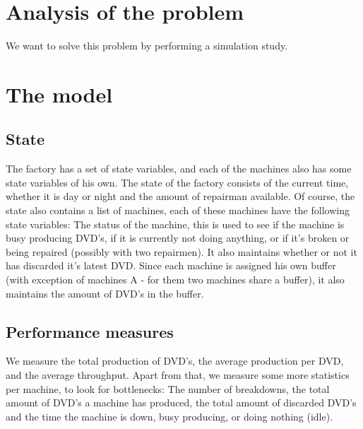 \documentclass{article}
\begin{document}
\section{Analysis of the problem}
We want to solve this problem by performing a simulation study. %


\section{The model}
\subsection{State}
The factory has a set of state variables, and each of the machines also has some state variables of his own.
The state of the factory consists of the current time, whether it is day or night and the amount of repairman available.
Of course, the state also contains a list of machines, each of these machines have the following state variables:
The status of the machine, this is used to see if the machine is busy producing DVD's, if it is currently not doing anything, or if it's broken or being repaired (possibly with two repairmen).
It also maintains whether or not it has discarded it's latest DVD\@.
Since each machine is assigned his own buffer (with exception of machines A - for them two machines share a buffer), it also maintains the amount of DVD's in the buffer.

\subsection{Performance measures}
\label{performance_measures}
We measure the total production of DVD's, the average production per DVD,
and the average throughput.
Apart from that, we measure some more statistics per machine, to look for bottlenecks:
The number of breakdowns, the total amount of DVD's a machine has produced,
the total amount of discarded DVD's and the time the machine is down,
busy producing, or doing nothing (idle).
\end{document}
